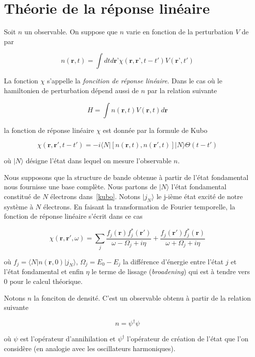 \chapter{Théorie de la réponse linéaire}\label{TRL}
Soit $n$ un observable. On suppose que $n$ varie en fonction de la perturbation $V$ de par

$$
n(\textbf{r}, t) = \int dt d\textbf{r'}  \chi (\textbf{r}, \textbf{r'}, t-t') V(\textbf{r'}, t')
$$

La fonction $\chi$ s'appelle la \textit{foncition de réponse linéaire}. Dans le cas où le hamiltonien de perturbation dépend aussi de $n$ par la relation suivante

$$
H = \int n(\textbf{r}, t) V(\textbf{r}, t) d\textbf{r}
$$

la fonction de réponse linéaire $\chi$ est donnée par la formule de Kubo~\cite{Abrikosov1963}

\begin{equation}\label{kubo}
  \chi (\textbf{r}, \textbf{r}', t-t') = -i \langle N | [n(\textbf{r}, t), n(\textbf{r}', t)] |N \rangle \Theta(t-t')
\end{equation}

où $|N \rangle $ désigne l'état dans lequel on mesure l'observable $n$.

Nous supposons que la structure de bande obtenue à partir de l'état fondamental nous fournisse une base complète. Nous partons de $|N \rangle$ l'état fondamental constitué de $N$ électrons dans~\ref{kubo}. Notons $| j_N \rangle $ le j-ième état excité de notre système à $N$ électrons. En faisant la transformation de Fourier temporelle, la fonction de réponse linéaire s'écrit dans ce cas

\begin{equation}
\chi (\textbf{r}, \textbf{r}', \omega) = \sum_j \frac{f_j(\textbf{r}) f_j^*(\textbf{r}') }{\omega - \Omega_j + i \eta} + \frac{f_j(\textbf{r}') f_j^*(\textbf{r}) }{\omega + \Omega_j + i \eta}
\end{equation}

où $f_j = \langle N | n(\textbf{r}, 0) | j_N \rangle$, $\Omega_j = E_0 - E_j$ la différence d'énergie entre l'état $j$ et l'état fondamental et enfin $\eta$ le terme de lissage (\textit{broadening}) qui est à tendre vers 0 pour le calcul théorique.

Notons $n$ la fonciton de densité. C'est un observable obtenu à partir de la relation suivante

$$
n = \psi^\dagger \psi
$$

où $\psi$ est l'opérateur d'annihilation et $\psi^\dagger$ l'opérateur de création de l'état que l'on considère (en analogie avec les oscillateurs harmoniques).

